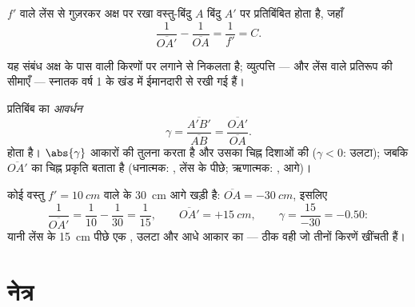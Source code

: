 \begin{theorem}[पतले लेंस का संयुग्मी संबंध]\label{thm:g11:lenses-and-eye:conjugate}
$f'$  वाले  लेंस से गुज़रकर अक्ष पर रखा
वस्तु-बिंदु $A$ बिंदु $A'$ पर प्रतिबिंबित होता है, जहाँ
\[
\frac{1}{\overline{OA'}} - \frac{1}{\overline{OA}} = \frac{1}{f'} = C .
\]
\end{theorem}
\admitted

\begin{remark}
यह संबंध अक्ष के पास वाली किरणों पर  लगाने से निकलता
है; व्युत्पत्ति --- और  लेंस वाले प्रतिरूप की सीमाएँ ---
स्नातक वर्ष 1 के खंड में ईमानदारी से रखी गई हैं।
\end{remark}

\begin{definition}[आवर्धन]\label{def:g11:lenses-and-eye:magnification}
प्रतिबिंब का \emph{आवर्धन}
\[
\gamma = \frac{\overline{A'B'}}{\overline{AB}}
       = \frac{\overline{OA'}}{\overline{OA}} .
\]
होता है। $\abs{\gamma}$ आकारों की तुलना करता है और उसका चिह्न दिशाओं की ($\gamma < 0$:
उलटा); जबकि $\overline{OA'}$ का चिह्न प्रकृति बताता है (धनात्मक:
, लेंस के पीछे; ऋणात्मक: , आगे)।
\end{definition}

\begin{example}[सूत्र काम पर]\label{ex:g11:lenses-and-eye:conjugate}
कोई वस्तु $f' = \qty{10}{cm}$ वाले  के \qty{30}{cm} आगे खड़ी है:
$\overline{OA} = \qty{-30}{cm}$, इसलिए
\[
\frac{1}{\overline{OA'}} = \frac{1}{10} - \frac{1}{30} = \frac{1}{15},
\qquad \overline{OA'} = +\qty{15}{cm},
\qquad \gamma = \frac{15}{-30} = -0.50 :
\]
यानी लेंस के \qty{15}{cm} पीछे एक , उलटा और
आधे आकार का --- ठीक वही जो तीनों किरणें खींचती हैं।
\end{example}

\section{नेत्र}


